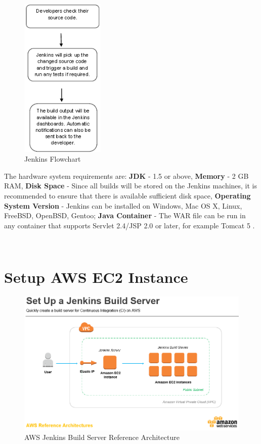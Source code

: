 \documentclass[12pt,a4paper,twoside]{article}
\begin{document}
\begin{figure}[H]
    \centering
        \includegraphics[width=4cm]{images-aws/jenkins_flowchart.png}
        \caption{Jenkins Flowchart \cite{JENKINS-FLOWCHART}}
\end{figure}


The hardware system requirements are: \textbf{JDK} - 1.5 or above, \textbf{Memory} - 2 GB RAM, 
 \textbf{Disk Space} - Since all builds will be stored on the Jenkins machines, it is recommended to ensure that there is available sufficient disk space, \textbf{Operating System Version} - Jenkins can be installed on Windows, Mac OS X, Linux, FreeBSD, OpenBSD, Gentoo; \textbf{Java Container} - The WAR file can be run in any container that supports Servlet 2.4/JSP 2.0 or later, for example Tomcat 5 \cite{JENKINS-FLOWCHART}.


~\newpage


\section{Setup AWS EC2 Instance}




\begin{figure}[H]
    \centering
        \includegraphics[width=15cm]{images-aws/aws-jenkins.png}
        \caption{AWS Jenkins Build Server Reference Architecture \cite{JENKINS-BUILD-SERVER}}
\end{figure}
\end{document}
